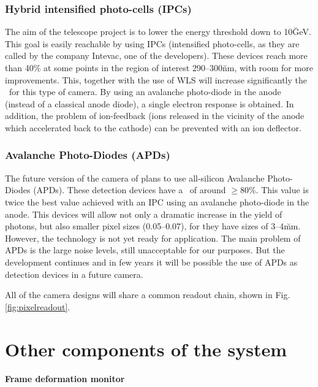 \subsubsection{Hybrid intensified photo-cells (IPCs)}
%
The aim of the telescope project is to lower the energy threshold down
to 10\u{GeV}. This goal is easily reachable by using IPCs (intensified
photo-cells, as they are called by the company Intevac, one of the
developers). These devices reach more than 40\% \QE at some points in
the region of interest 290--300\u{nm}, with room for more
improvements. This, together with the use of WLS will increase
significantly the \QEeff\ for this type of camera. By using an
avalanche photo-diode in the anode (instead of a classical anode
diode), a single electron response is obtained. In addition, the
problem of ion-feedback (ions released in the vicinity of the anode
which accelerated back to the cathode) can be prevented with an ion
deflector.

\subsubsection{Avalanche Photo-Diodes (APDs)}
%
The future version of the camera of \MAGIC plans to use all-silicon
Avalanche Photo-Diodes (APDs). These detection devices have a \QEeff\ 
of around $\geq$80\%. This value is twice the best value achieved with
an IPC using an avalanche photo-diode in the anode. This devices will
allow not only a dramatic increase in the yield of \Cherenkov photons,
but also smaller pixel sizes (0.05\deg--0.07\deg), for they have sizes
of 3--4\u{mm}. However, the technology is not yet ready for
application. The main problem of APDs is the large noise levels, still
unacceptable for our purposes. But the development continues and in
few years it will be possible the use of APDs as detection devices in
a future \MAGIC camera.

All of the camera designs will share a common readout chain, shown in
Fig.\ref{fig:pixelreadout}. 

\MORE%

\section{Other components of the system}

\paragraph{Frame deformation monitor}

